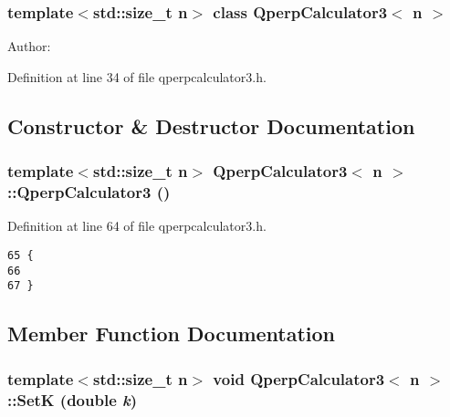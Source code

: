 \subsubsection*{template$<$std::size\_\-t n$>$ class QperpCalculator3$<$ n $>$}

\begin{Desc}
\item[Author:]\end{Desc}


Definition at line 34 of file qperpcalculator3.h.

\subsection{Constructor \& Destructor Documentation}
\subsubsection{\setlength{\rightskip}{0pt plus 5cm}template$<$std::size\_\-t n$>$ {\bf QperpCalculator3}$<$ n $>$::{\bf QperpCalculator3} ()\hspace{0.3cm}{\tt  [inline]}}\label{classQperpCalculator3_e093a25aa0ff255a5ec74cf1b4aac57a}




Definition at line 64 of file qperpcalculator3.h.

\begin{Code}\begin{verbatim}65 {
66 
67 }
\end{verbatim}
\end{Code}




\subsection{Member Function Documentation}
\subsubsection{\setlength{\rightskip}{0pt plus 5cm}template$<$std::size\_\-t n$>$ void {\bf QperpCalculator3}$<$ n $>$::SetK (double {\em k})\hspace{0.3cm}{\tt  [inline]}}\label{classQperpCalculator3_df6a2c2d75a811af517cfd68bd3be76a}




